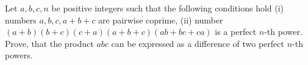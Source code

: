 Let $a,b,c,n$ be positive integers such that the following conditions hold
(i) numbers $a,b,c,a+b+c$ are pairwise coprime,
(ii) number $(a+b)(b+c)(c+a)(a+b+c)(ab+bc+ca)$ is a perfect $n$-th power.
Prove, that the product $abc$ can be expressed as a difference of two perfect $n$-th powers.